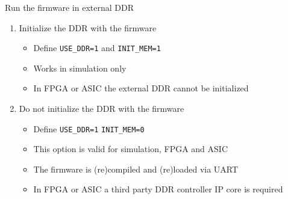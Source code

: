 \documentclass [xcolor=svgnames, t] {beamer}
\begin{document}
\begin{frame}{Run the firmware in external DDR}
\begin{enumerate}
\item Initialize the DDR with the firmware
  \begin{itemize}
  \item Define {\tt USE\_DDR=1} and {\tt INIT\_MEM=1}
  \item Works in simulation only
  \item In FPGA or ASIC the external DDR cannot be initialized
  \end{itemize}
\item Do not initialize the DDR with the firmware
  \begin{itemize}
  \item Define {\tt USE\_DDR=1} {\tt INIT\_MEM=0}
  \item This option is valid for simulation, FPGA and ASIC
  \item The firmware is (re)compiled and (re)loaded via UART
  \item In FPGA or ASIC a third party DDR controller IP core is required
  \end{itemize}
\end{enumerate}
\end{frame}
\end{document}

